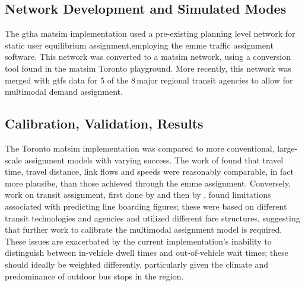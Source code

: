\subsection{Network Development and Simulated Modes}  
The \gls{gtha} \gls{matsim} implementation used a pre-existing planning level network for static user equilibrium assignment,employing the \gls{emme} traffic assignment software. This network was converted to a \gls{matsim} network, using a conversion tool found in the \gls{matsim} Toronto playground. More recently, this network was merged with \gls{gtfs} data for 5 of the 8\,major regional transit agencies to allow for \gls{multimodal} demand assignment.  

\subsection{Calibration, Validation, Results}
The Toronto \gls{matsim} implementation was compared to more conventional, large-scale assignment models with varying success. The work of \citet[][]{GaoWEtAl_TRR_2010} found that travel time, travel distance, link flows and speeds were reasonably comparable,  in fact more plausibe, than those achieved through the \gls{emme} assignment. Conversely, work on transit assignment, first done by \citet[][]{Kucirek_MastersThesis_2012} and then by \citet[][]{WeissEtAl_CJCE_2012}, found limitations associated with predicting line boarding figures; these were based on different transit technologies and agencies and utilized different fare structures, suggesting that further work to calibrate the \gls{multimodal} assignment model is required. These issues are exacerbated by the current implementation's inability to distinguish between in-vehicle dwell times and out-of-vehicle wait times; these should ideally be weighted differently, particularly given the climate and predominance of outdoor bus stops in the region. 

